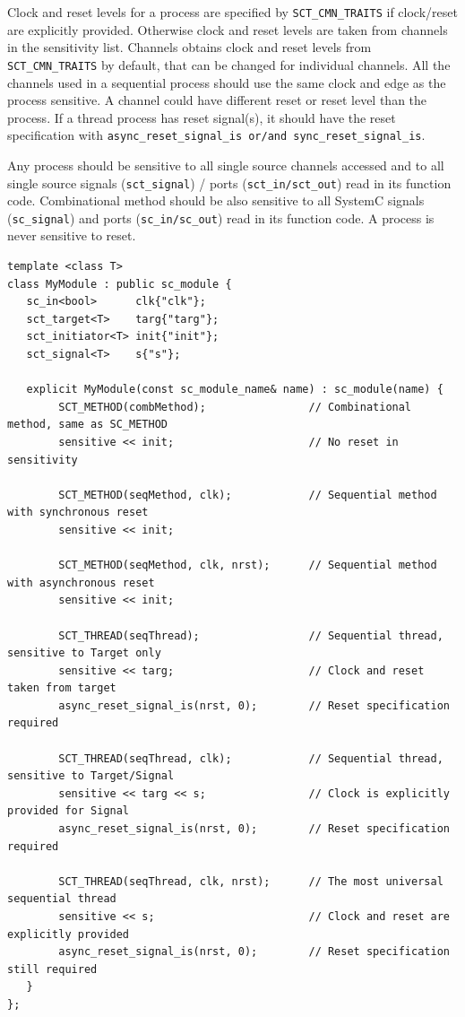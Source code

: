 Clock and reset levels for a process are specified by {\tt SCT\_CMN\_TRAITS} if clock/reset are explicitly provided. Otherwise clock and reset levels are taken from channels in the sensitivity list. Channels obtains clock and reset levels from {\tt SCT\_CMN\_TRAITS} by default, that can be changed for individual channels. All the channels used in a sequential process should use the same clock and edge as the process sensitive. A channel could have different reset or reset level than the process. If a thread process has reset signal(s), it should have the reset specification with {\tt async\_reset\_signal\_is or/and sync\_reset\_signal\_is}.

Any process should be sensitive to all single source channels accessed and to all single source signals ({\tt sct\_signal}) / ports ({\tt sct\_in/sct\_out}) read in its function code. Combinational method should be also sensitive to all SystemC signals ({\tt sc\_signal}) and ports ({\tt sc\_in/sc\_out}) read in its function code. A process is never sensitive to reset.

\begin{lstlisting}[style=mycpp]
template <class T>
class MyModule : public sc_module {
   sc_in<bool>      clk{"clk"};
   sct_target<T>    targ{"targ"};
   sct_initiator<T> init{"init"};
   sct_signal<T>    s{"s"};

   explicit MyModule(const sc_module_name& name) : sc_module(name) {
        SCT_METHOD(combMethod);                // Combinational method, same as SC_METHOD
        sensitive << init;                     // No reset in sensitivity

        SCT_METHOD(seqMethod, clk);            // Sequential method with synchronous reset
        sensitive << init;                           

        SCT_METHOD(seqMethod, clk, nrst);      // Sequential method with asynchronous reset
        sensitive << init;                           

        SCT_THREAD(seqThread);                 // Sequential thread, sensitive to Target only
        sensitive << targ;                     // Clock and reset taken from target
        async_reset_signal_is(nrst, 0);        // Reset specification required

        SCT_THREAD(seqThread, clk);            // Sequential thread, sensitive to Target/Signal
        sensitive << targ << s;                // Clock is explicitly provided for Signal
        async_reset_signal_is(nrst, 0);        // Reset specification required

        SCT_THREAD(seqThread, clk, nrst);      // The most universal sequential thread
        sensitive << s;                        // Clock and reset are explicitly provided
        async_reset_signal_is(nrst, 0);        // Reset specification still required
   }
};
\end{lstlisting}

